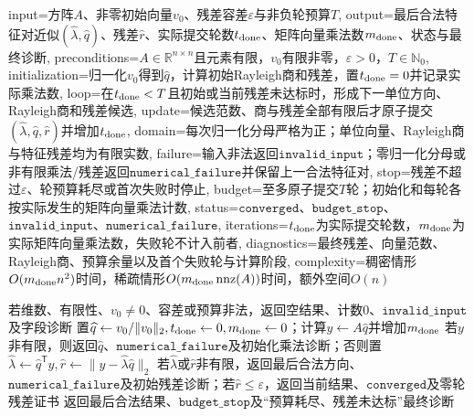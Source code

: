 \begin{AlgorithmContract}{
  input={方阵$A$、非零初始向量$v_0$、残差容差$\varepsilon$与非负轮预算$T$},
  output={最后合法特征对近似$(\widehat\lambda,\widehat q)$、残差$\widehat r$、实际提交轮数$t_{\rm done}$、矩阵向量乘法数$m_{\rm done}$、状态与最终诊断},
  preconditions={$A\in\mathbb R^{n\times n}$且元素有限，$v_0$有限非零，$\varepsilon>0$，$T\in\mathbb N_0$},
  initialization={归一化$v_0$得到$\widehat q$，计算初始Rayleigh商和残差，置$t_{\rm done}=0$并记录实际乘法数},
  loop={在$t_{\rm done}<T$且初始或当前残差未达标时，形成下一单位方向、Rayleigh商和残差候选},
  update={候选范数、商与残差全部有限后才原子提交$(\widehat\lambda,\widehat q,\widehat r)$并增加$t_{\rm done}$},
  domain={每次归一化分母严格为正；单位向量、Rayleigh商与特征残差均为有限实数},
  failure={输入非法返回$\mathtt{invalid\_input}$；零归一化分母或非有限乘法/残差返回$\mathtt{numerical\_failure}$并保留上一合法特征对},
  stop={残差不超过$\varepsilon$、轮预算耗尽或首次失败时停止},
  budget={至多原子提交$T$轮；初始化和每轮各按实际发生的矩阵向量乘法计数},
  status={$\mathtt{converged}$、$\mathtt{budget\_stop}$、$\mathtt{invalid\_input}$、$\mathtt{numerical\_failure}$},
  iterations={$t_{\rm done}$为实际提交轮数，$m_{\rm done}$为实际矩阵向量乘法数，失败轮不计入前者},
  diagnostics={最终残差、向量范数、Rayleigh商、预算余量以及首个失败轮与计算阶段},
  complexity={稠密情形$O(m_{\rm done}n^2)$时间，稀疏情形$O(m_{\rm done}\operatorname{nnz}(A))$时间，额外空间$O(n)$}
}
\begin{algorithm}[H]
\caption{归一化幂法}\label{alg:V1-C02-power}
若维数、有限性、$v_0\ne0$、容差或预算非法，返回空结果、计数$0$、$\mathtt{invalid\_input}$及字段诊断\;
置$\widehat q\leftarrow v_0/\|v_0\|_2,t_{\rm done}\leftarrow0,m_{\rm done}\leftarrow0$；计算$y\leftarrow A\widehat q$并增加$m_{\rm done}$\;
若$y$非有限，则返回$\widehat q$、$\mathtt{numerical\_failure}$及初始化乘法诊断；否则置$\widehat\lambda\leftarrow\widehat q^{\mathsf T}y,\widehat r\leftarrow\|y-\widehat\lambda\widehat q\|_2$\;
若$\widehat\lambda$或$\widehat r$非有限，返回最后合法方向、$\mathtt{numerical\_failure}$及初始残差诊断；若$\widehat r\le\varepsilon$，返回当前结果、$\mathtt{converged}$及零轮残差证书\;
返回最后合法结果、$\mathtt{budget\_stop}$及“预算耗尽、残差未达标”最终诊断\;
\end{algorithm}
\end{AlgorithmContract}

